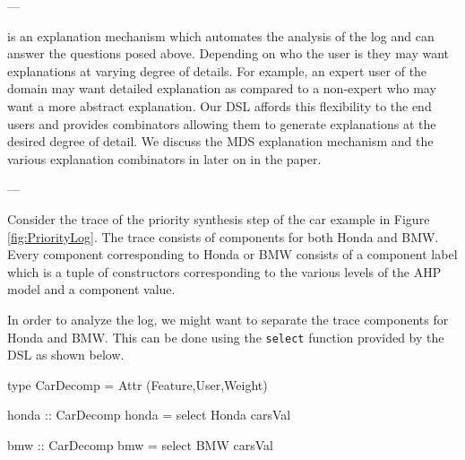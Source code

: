\documentclass{jfp}
\newcommand{\prog}[1]{\texttt{#1}}
\begin{document}
---

is an explanation mechanism which automates the analysis of the log and can answer the questions posed above. Depending on who the user is they may want explanations at varying degree of details. For example, an expert user of the domain may want detailed explanation as compared to a non-expert who may want a more abstract explanation. Our DSL affords this flexibility to the end users and provides combinators allowing them to generate explanations at the desired degree of detail. We discuss the MDS explanation mechanism and the various explanation combinators in later on in the paper. 

---

Consider the trace of the priority synthesis step of the car example in Figure \ref{fig:PriorityLog}. The trace consists of components for both Honda and BMW. Every component corresponding to Honda or BMW consists of a component label which is a tuple of constructors corresponding to the various levels of the AHP model and a component value. 

In order to analyze the log, we might want to separate the trace components for Honda and BMW. This can be done using the \prog{select} function provided by the DSL as shown below. 
\begin{haskellcode}
type CarDecomp = Attr (Feature,User,Weight)

honda :: CarDecomp
honda = select Honda carsVal

bmw :: CarDecomp
bmw = select BMW carsVal
\end{haskellcode}
\end{document}
